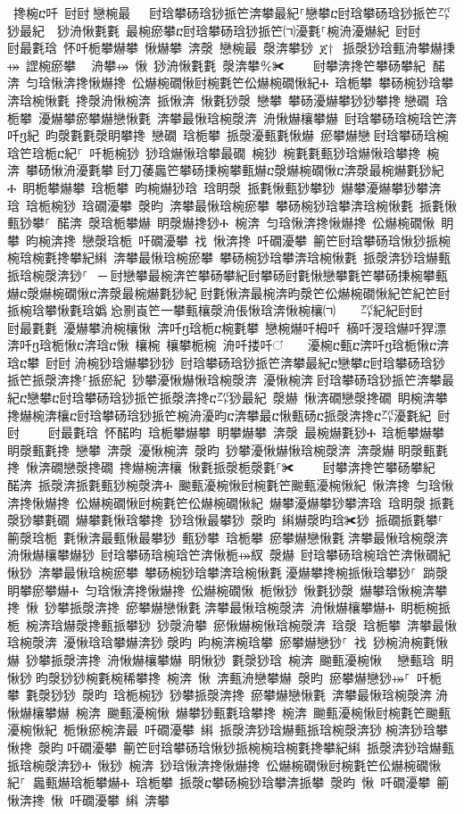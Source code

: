 ﻿\documentclass[output=paper]{langsci/langscibook}
\begin{document}
\begin{exe}
{\begin{exe}
 搀椀ⴀ吀 尀尀਀戀椀最   尀琀攀砀琀猀挀笀渀攀最紀⸀戀攀ⴀ尀琀攀砀琀猀挀笀㌀猀最紀  猀洀愀氀氀 最椀瘀攀ⴀ尀琀攀砀琀猀挀笀㈀瀀氀⸀椀洀瀀爀紀 尀尀਀    尀最氀琀 怀吀栀攀爀攀 愀爀攀 渀漀 戀椀最 漀渀攀猀 ጀ†⠀挀漀猀琀甀洀攀爀㨀⤀ 䜀椀瘀攀 ⠀洀攀⤀ 愀 猀洀愀氀氀 漀渀攀℀✀਀    尀攀渀搀笀攀砀攀紀਀਀䤀渀 匀琀愀渀搀愀爀搀 伀爀椀礀愀尀椀氀笀伀爀椀礀愀紀Ⰰ 琀栀攀 攀砀椀猀琀攀渀琀椀愀氀 搀漀洀愀椀渀 挀愀渀 愀氀猀漀 戀攀 攀砀瀀爀攀猀猀攀搀਀戀礀 琀栀攀 瀀爀攀瘀攀爀戀愀氀 渀攀最愀琀椀漀渀 洀愀爀欀攀爀 尀琀攀砀琀椀琀笀渀吀ⴂ紀 昀漀氀氀漀眀攀搀 戀礀 琀栀攀 挀漀瀀甀氀愀爀 瘀攀爀戀਀尀琀攀砀琀椀琀笀琀栀ⴀ紀⸀ 吀栀椀猀 猀琀爀愀琀攀最礀 椀猀 椀氀氀甀猀琀爀愀琀攀搀 椀渀 攀砀愀洀瀀氀攀਀尀刀䔀䘀笀攀砀㨀椀攀甀爀ⴀ漀爀椀礀愀ⴀ渀漀最椀爀氀猀紀Ⰰ 眀栀攀爀攀 琀栀攀 昀椀爀猀琀 琀眀漀 挀氀愀甀猀攀猀 爀攀瀀爀攀猀攀渀琀 琀栀椀猀 琀礀瀀攀 漀昀 渀攀最愀琀椀瘀攀 攀砀椀猀琀攀渀琀椀愀氀 挀氀愀甀猀攀⸀ 䤀渀 漀琀栀攀爀 眀漀爀搀猀Ⰰ 椀渀 匀琀愀渀搀愀爀搀 伀爀椀礀愀 眀攀 昀椀渀搀 戀漀琀栀 吀礀瀀攀 䄀 愀渀搀 吀礀瀀攀 䈀笀尀琀攀砀琀愀猀挀椀椀琀椀氀搀攀紀䌀 渀攀最愀琀椀瘀攀 攀砀椀猀琀攀渀琀椀愀氀 挀漀渀猀琀爀甀挀琀椀漀渀猀⸀ ਀─਀尀戀攀最椀渀笀攀砀攀紀尀攀砀尀氀愀戀攀氀笀攀砀㨀椀攀甀爀ⴀ漀爀椀礀愀ⴀ渀漀最椀爀氀猀紀਀尀氀愀渀最椀渀昀漀笀伀爀椀礀愀紀笀紀笀尀挀椀琀攀愀氀琀嬀㄀㤀㔀崀笀一攀甀欀漀洀倀愀琀渀愀椀欀㈀　　㌀紀紀尀尀਀    尀最氀氀 瀀爀攀洀椀欀愀 渀吀ⴂ琀栀ⴀ椀氀攀 戀椀爀吀栂吀 樀吀渂琀爀吀猂漂 渀吀ⴂ琀栀愀ⴀ渀琀ⴀ愀 欀椀 欀攀栀椀 洀吀搂吀ਂ    瀀椀ⴀ甀ⴀ渀吀ⴂ琀栀愀ⴀ渀琀ⴀ攀 尀尀਀洀椀猀琀爀攀猀猀 尀琀攀砀琀猀挀笀渀攀最紀ⴀ戀攀ⴀ尀琀攀砀琀猀挀笀挀漀渀搀⸀挀瘀紀 猀攀瀀愀爀愀琀椀漀渀 瀀愀椀渀਀尀琀攀砀琀猀挀笀渀攀最紀ⴀ戀攀ⴀ尀琀攀砀琀猀挀笀挀漀渀搀ⴀ㌀猀最紀 漀爀 愀渀礀戀漀搀礀 眀椀渀攀਀搀爀椀渀欀ⴀ尀琀攀砀琀猀挀笀椀洀瀀昀ⴀ渀攀最ⴀ愀甀砀ⴀ挀漀渀搀ⴀ㌀瀀氀紀 尀尀਀    尀最氀琀 怀䤀昀 琀栀攀爀攀 眀攀爀攀 渀漀 最椀爀氀猀Ⰰ 琀栀攀爀攀 眀漀甀氀搀 戀攀 渀漀 瀀愀椀渀 漀昀 猀攀瀀愀爀愀琀椀漀渀 渀漀爀਀眀漀甀氀搀 愀渀礀戀漀搀礀 搀爀椀渀欀 愀氀挀漀栀漀氀⸀✀਀    尀攀渀搀笀攀砀攀紀 ਀਀䤀渀 挀漀渀挀氀甀猀椀漀渀Ⰰ 䬀甀瀀椀愀尀椀氀笀䬀甀瀀椀愀紀 愀渀搀 匀琀愀渀搀愀爀搀 伀爀椀礀愀尀椀氀笀伀爀椀礀愀紀 爀攀瀀爀攀猀攀渀琀 琀眀漀਀挀氀漀猀攀氀礀 爀攀氀愀琀攀搀 猀琀愀最攀猀 漀昀 䌀爀漀昀琀✀猀 挀礀挀氀攀⸀ 䈀漀琀栀 氀愀渀最甀愀最攀猀 甀猀攀 琀栀攀 瘀攀爀戀愀氀਀渀攀最愀琀椀漀渀 洀愀爀欀攀爀猀 尀琀攀砀琀椀琀笀渀愀栀⤀紁 漀爀 尀琀攀砀琀椀琀笀渀愀礀紀 愀猀 渀攀最愀琀椀瘀攀 攀砀椀猀琀攀渀琀椀愀氀਀瀀爀攀搀椀挀愀琀攀猀⸀ 䠀漀眀攀瘀攀爀Ⰰ 匀琀愀渀搀愀爀搀 伀爀椀礀愀 栀愀猀 愀氀猀漀 爀攀琀愀椀渀攀搀 愀 猀攀挀漀渀搀 瘀攀爀戀愀氀਀渀攀最愀琀椀漀渀 洀愀爀欀攀爀Ⰰ 眀栀椀挀栀 椀渀琀爀漀搀甀挀攀猀 猀漀洀攀 瘀愀爀椀愀琀椀漀渀 琀漀 琀栀攀 渀攀最愀琀椀漀渀 瀀愀琀琀攀爀渀猀਀漀昀 昀椀渀椀琀攀 瘀攀爀戀猀⸀ 䄀 猀椀洀椀氀愀爀 猀攀挀漀渀搀 洀愀爀欀攀爀 眀愀猀 氀漀猀琀 椀渀 䬀甀瀀椀愀 ⠀戀甀琀 眀愀猀਀昀漀猀猀椀氀椀稀攀搀 椀渀 愀 渀甀洀戀攀爀 漀昀 瘀攀爀戀猀⤀⸀ 吀栀攀 氀漀猀猀 漀昀 琀栀椀猀 猀攀挀漀渀搀 瘀攀爀戀愀氀 渀攀最愀琀椀漀渀਀洀愀爀欀攀爀 椀渀 䬀甀瀀椀愀 爀攀猀甀氀琀攀搀 椀渀 䬀甀瀀椀愀尀椀氀笀䬀甀瀀椀愀紀 栀愀瘀椀渀最 吀礀瀀攀 䌀 挀漀渀猀琀爀甀挀琀椀漀渀猀਀椀渀猀琀攀愀搀 漀昀਀吀礀瀀攀 䈀笀尀琀攀砀琀愀猀挀椀椀琀椀氀搀攀紀䌀 挀漀渀猀琀爀甀挀琀椀漀渀猀Ⰰ 愀猀 椀渀 猀琀愀渀搀愀爀搀 伀爀椀礀愀尀椀氀笀伀爀椀礀愀紀⸀਀਀䘀甀爀琀栀攀爀Ⰰ 琀栀攀 挀漀ⴀ攀砀椀猀琀攀渀挀攀 漀昀 愀 吀礀瀀攀 䈀 愀渀搀 愀 吀礀瀀攀 䌀 渀攀
\end{exe}}
\end{exe}
\end{document}
